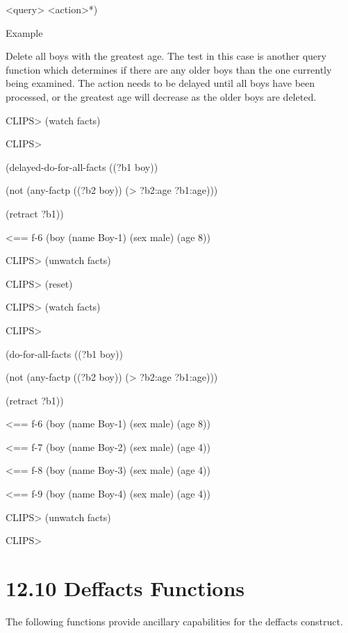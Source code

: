 \documentclass[letterpaper,10pt,english]{sphinxmanual}
\begin{document}
\begin{sphinxVerbatim}[commandchars=\\\{\}]
 
\end{sphinxVerbatim}

\textless{}query\textgreater{} \textless{}action\textgreater{}*)

Example

Delete all boys with the greatest age. The test in this case is another
query function which determines if there are any older boys than the one
currently being examined. The action needs to be delayed until all boys
have been processed, or the greatest age will decrease as the older boys
are deleted.

CLIPS\textgreater{} (watch facts)

CLIPS\textgreater{}

(delayed-do-for-all-facts ((?b1 boy))

(not (any-factp ((?b2 boy)) (\textgreater{} ?b2:age ?b1:age)))

(retract ?b1))

\textless{}== f-6 (boy (name Boy-1) (sex male) (age 8))

CLIPS\textgreater{} (unwatch facts)

CLIPS\textgreater{} (reset)

CLIPS\textgreater{} (watch facts)

CLIPS\textgreater{}

(do-for-all-facts ((?b1 boy))

(not (any-factp ((?b2 boy)) (\textgreater{} ?b2:age ?b1:age)))

(retract ?b1))

\textless{}== f-6 (boy (name Boy-1) (sex male) (age 8))

\textless{}== f-7 (boy (name Boy-2) (sex male) (age 4))

\textless{}== f-8 (boy (name Boy-3) (sex male) (age 4))

\textless{}== f-9 (boy (name Boy-4) (sex male) (age 4))

CLIPS\textgreater{} (unwatch facts)

CLIPS\textgreater{}


\section{12.10 Deffacts Functions}
\label{\detokenize{actions:deffacts-functions}}
The following functions provide ancillary capabilities for the deffacts
construct.
\end{document}
